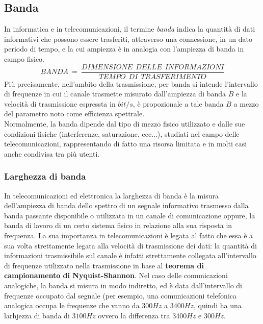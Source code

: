 \documentclass[12pt,oneside,openany]{memoir}
\numberwithin{equation}{subsection}
\begin{document}
\subsection{Banda}
In informatica e in telecomunicazioni, il termine \textit{banda} indica la
quantit\`a di dati informativi che possono essere trasferiti, attraverso una
connessione, in un dato periodo di tempo, e la cui ampiezza \`e in analogia con
l'ampiezza di banda in campo fisico.
\[
	BANDA \ = \ \frac{DIMENSIONE \ \ DELLE \ \ INFORMAZIONI}
	{TEMPO \ \ DI \ \ TRASFERIMENTO}
\]
Pi\`u precisamente, nell'ambito della trasmissione, per banda si intende
l'intervallo di frequenze in cui il canale trasmette misurato dall'ampiezza di
banda $B$ e la velocit\`a di trasmissione espressta in $bit/s$, \`e propozionale
a tale banda $B$ a mezzo del parametro noto come efficienza spettrale.\\
Normalmente, la banda dipende dal tipo di mezzo fisico utilizzato e dalle sue
condizioni fisiche (interferenze, saturazione, ecc...), studiati nel campo delle
telecomunicazioni, rappresentando di fatto una risorsa limitata e in molti casi
anche condivisa tra pi\`u utenti.


\subsubsection{Larghezza di banda}
In telecomunicazioni ed elettronica la larghezza di banda \`e la misura
dell'ampiezza di banda dello spettro di un segnale informativo trasmesso dalla
banda passante disponibile o utilizzata in un canale di comunicazione oppure,
la banda di lavoro di un certo sistema fisico in relazione alla sua risposta in
frequenza. La sua importanza in telecomunicazioni \`e legata al fatto che essa
\`e a sua volta strettamente legata alla velocit\`a di trasmissione dei dati:
la quantit\`a di informazioni trasmissibile sul canale \`e infatti strettamente
collegata all'intervallo di frequenze utilizzato nella trasmissione in base al
\textbf{teorema di campionamento di Nyquist-Shannon}.
\bigbreak
Nel caso delle comunicazioni analogiche, la banda si misura in modo indiretto,
ed \`e data dall'intervallo di frequenze occupato dal segnale (per esempio, una
comunicazioni telefonica analogica occupa le frequenze che vanno da $300 Hz$ a
$3400 Hz$, quindi ha una larhjezza di banda di $3100 Hz$ ovvero la differenza
tra $3400 Hz$ e $300 Hz$.
\end{document}
